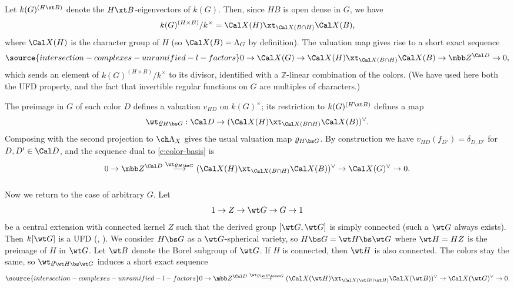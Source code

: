Let $k(G)^{(H\xt B)}$ denote the $H\xt B$-eigenvectors
of $k(G)$.
Then, since $H B$ is open dense in $G$, we have
\[ k(G)^{(H\times B)}/k^\times = \Cal X(H) \xt_{\Cal X(B\cap H)} \Cal X(B),
\]
where $\Cal X(H)$ is the character group of $H$
(so $\Cal X(B)=\Lambda_{G}$ by definition). The valuation map gives rise to a short exact sequence
\begin{equation} \label{e:color-basis}
\source{intersection-complexes-unramified-l-factors}
 0 \to \Cal X(G) \to
    \Cal X(H) \xt_{\Cal X(B \cap H)} \Cal X(B) \to   \mbb Z^{\Cal D} \to 0,
\end{equation}
which sends an element of $k(G)^{(H\times B)}/k^\times$ to its divisor, identified with a $\mathbb Z$-linear combination of the colors. (We have used here both the UFD property, and the fact that invertible regular functions on $G$ are multiples of characters.)


The preimage in $G$ of each color $D$ defines a valuation $v_{HD}$ on $k(G)^\times$; its restriction to $k(G)^{(H\xt B)}$ defines a map
\[
    \wt\varrho_{H\bs G} : \Cal D \to (\Cal X(H) \xt_{\Cal X(B\cap H)} \Cal X(B))^\vee.
\]
Composing with the second projection to $\ch\Lambda_X$ gives the usual
valuation map $\varrho_{H\bs G}$.
By construction we have $v_{HD}(f_{D'}) = \delta_{D,D'}$
for $D,D'\in \Cal D$, and the sequence dual to \eqref{e:color-basis} is
\[
    0\to \mbb Z^{\Cal D} \overset{\wt\varrho_{H\bs G}}\longrightarrow
(\Cal X(H) \xt_{\Cal X(B\cap H)} \Cal X(B))^\vee \to
\Cal X(G)^\vee \to 0.
\]

\subsubsection{} \label{sect:Xcover}
Now we return to the case of arbitrary $G$. Let
\[ 1 \to Z \to \wt G \to G \to 1 \]
be a central extension with connected
kernel $Z$ such that the derived group $[\wt G, \wt G]$ is simply
connected (such a $\wt G$ always exists).
Then $k[\wt G]$ is a UFD (\cite[Proposition 4.6]{KKLV}, \cite{Iv}).
We consider $H\bs G$ as a $\wt G$-spherical variety, so
$H\bs G = \wt H \bs \wt G$ where $\wt H = HZ$ is the preimage of $H$
in $\wt G$. Let $\wt B$ denote the Borel subgroup of $\wt G$.
If $H$ is connected, then $\wt H$ is also connected.
The colors stay the same, so
$\wt\varrho_{\wt H\bs \wt G}$ induces a short exact sequence
\begin{equation} \label{e:color-ses}
\source{intersection-complexes-unramified-l-factors}
0 \to \mbb Z^{\Cal D} \overset{\wt\varrho_{\wt H\bs \wt G}}\longrightarrow
(\Cal X(\wt H) \xt_{\Cal X(\wt B\cap \wt H)} \Cal X(\wt B))^\vee \to
\Cal X(\wt G)^\vee \to 0.
\end{equation}



